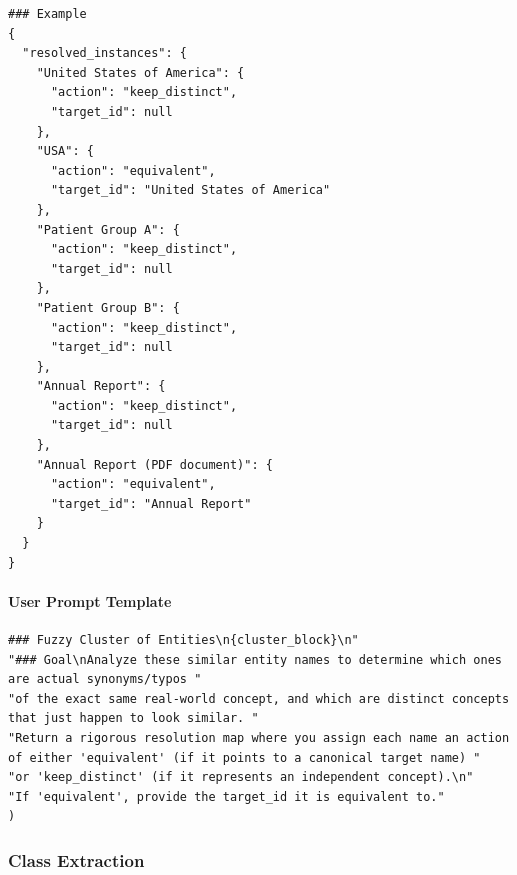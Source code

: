 \begin{verbatim}
### Example
{
  "resolved_instances": {
    "United States of America": {
      "action": "keep_distinct",
      "target_id": null
    },
    "USA": {
      "action": "equivalent",
      "target_id": "United States of America"
    },
    "Patient Group A": {
      "action": "keep_distinct",
      "target_id": null
    },
    "Patient Group B": {
      "action": "keep_distinct",
      "target_id": null
    },
    "Annual Report": {
      "action": "keep_distinct",
      "target_id": null
    },
    "Annual Report (PDF document)": {
      "action": "equivalent",
      "target_id": "Annual Report"
    }
  }
}
\end{verbatim}

\paragraph*{User Prompt Template}
\begin{verbatim}
### Fuzzy Cluster of Entities\n{cluster_block}\n"
"### Goal\nAnalyze these similar entity names to determine which ones are actual synonyms/typos "
"of the exact same real-world concept, and which are distinct concepts that just happen to look similar. "
"Return a rigorous resolution map where you assign each name an action of either 'equivalent' (if it points to a canonical target name) "
"or 'keep_distinct' (if it represents an independent concept).\n"
"If 'equivalent', provide the target_id it is equivalent to."
)
\end{verbatim}

\vspace{1em}

\subsubsection*{Class Extraction}

